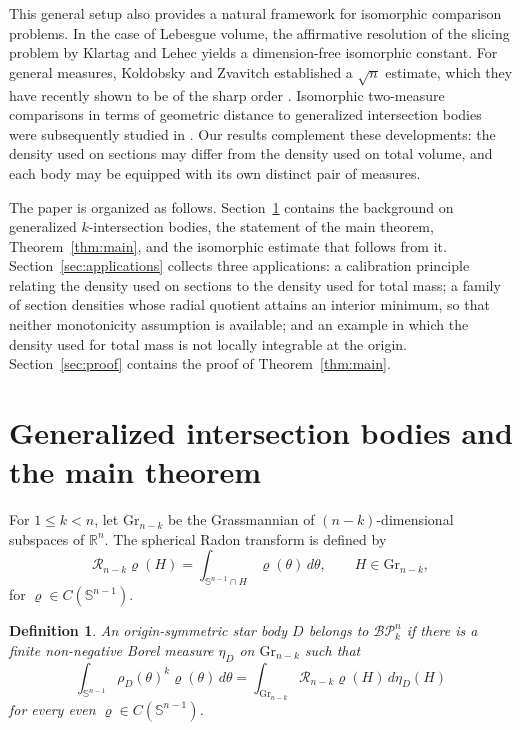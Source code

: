 \documentclass{amsart}
\newtheorem{definition}[theorem]{Definition}
\theoremstyle{remark}
\newcommand{\R}{\mathbb{R}}
\newcommand{\Sph}{\mathbb{S}}
\newcommand{\BP}{\mathcal{BP}}
\newcommand{\Gr}{\mathrm{Gr}}
\newcommand{\dd}{\,d}
\begin{document}
This general setup also provides a natural framework for isomorphic comparison
problems. In the case of Lebesgue volume, the affirmative resolution of the
slicing problem by Klartag and Lehec \cite{KlartagLehec2025} yields a
dimension-free isomorphic constant. For general measures, Koldobsky and
Zvavitch \cite{KoldobskyZvavitch2015} established a $\sqrt{n}$ estimate, which
they have recently shown to be of the sharp order
\cite{KoldobskyZvavitch2026}. Isomorphic
two-measure comparisons in terms of geometric distance to generalized
intersection bodies were subsequently studied in
\cite{KoldobskyPaourisZvavitch2022}. Our results complement these
developments: the density used on sections may differ from the density used on
total volume, and each body may be equipped with its own distinct pair of
measures.

The paper is organized as follows. Section~\ref{sec:main} contains the
background on generalized $k$-intersection bodies, the statement of the main
theorem, Theorem~\ref{thm:main}, and the isomorphic estimate that follows from
it. Section~\ref{sec:applications} collects three applications: a calibration
principle relating the density used on sections to the density used for total
mass; a family of section densities whose radial quotient attains an interior
minimum, so that neither monotonicity assumption is available; and an example
in which the density used for total mass is not locally integrable at the
origin. Section~\ref{sec:proof} contains the proof of
Theorem~\ref{thm:main}.

\section{Generalized intersection bodies and the main theorem}
\label{sec:main}

For $1\leq k<n$, let $\Gr_{n-k}$ be the Grassmannian of
$(n-k)$-dimensional subspaces of $\R^n$. The spherical Radon transform is
defined by
\[
 \mathcal R_{n-k}\varrho(H)
 =\int_{\Sph^{n-1}\cap H}\varrho(\theta)\dd\theta,
 \qquad H\in\Gr_{n-k},
\]
for $\varrho\in C(\Sph^{n-1})$.

\begin{definition}\label{def:BP}
An origin-symmetric star body $D$ belongs to $\BP_k^n$ if there is a finite
non-negative Borel measure $\eta_D$ on $\Gr_{n-k}$ such that
\begin{equation}\label{eq:BP-definition}
 \int_{\Sph^{n-1}}\rho_D(\theta)^k \varrho(\theta)\dd\theta
 =\int_{\Gr_{n-k}}\mathcal R_{n-k}\varrho(H)\dd\eta_D(H)
\end{equation}
for every even $\varrho\in C(\Sph^{n-1})$.
\end{definition}
\end{document}
